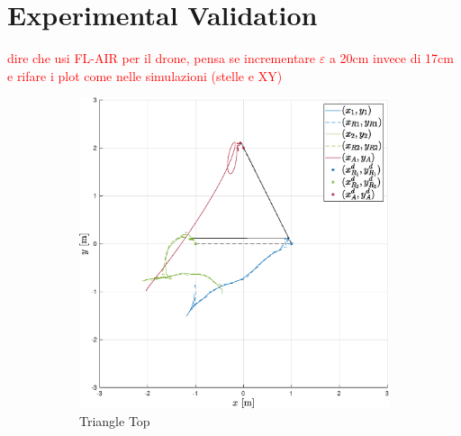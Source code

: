 \documentclass{ifacconf}
\begin{document}
\section{Experimental Validation}
\label{sec:experimental_validation}
\textcolor{red}{dire che usi FL-AIR per il drone, pensa 
se incrementare $\varepsilon$ a 20cm invece di 17cm e rifare 
i plot come nelle simulazioni (stelle e XY)}
\begin{figure}
    \centering
    \begin{subfigure}[b]{0.31\columnwidth}
        \centering
        \includegraphics[width=\linewidth]{images/experiment/nominal/1st_scenario_exp.eps}
        \caption{Triangle Top}
    \end{subfigure}
    \begin{subfigure}[b]{0.31\columnwidth}
        \centering

\end{subfigure}
\end{figure}
\end{document}
